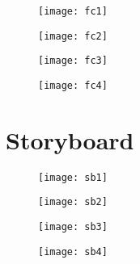 \begin{figure}[!ht]
  \begin{center}
    \texttt{[image: fc1]}
  \end{center}
\end{figure}

\begin{figure}[!ht]
  \begin{center}
    \texttt{[image: fc2]}
  \end{center}
\end{figure}

\begin{figure}[!ht]
  \begin{center}
    \texttt{[image: fc3]}
  \end{center}
\end{figure}

\begin{figure}[!ht]
  \begin{center}
    \texttt{[image: fc4]}
  \end{center}
\end{figure}

\chapter{Storyboard}

\begin{figure}[!ht]
  \begin{center}
    \texttt{[image: sb1]}
  \end{center}
\end{figure}

\begin{figure}[!ht]
  \begin{center}
    \texttt{[image: sb2]}
  \end{center}
\end{figure}

\begin{figure}[!ht]
  \begin{center}
    \texttt{[image: sb3]}
  \end{center}
\end{figure}

\begin{figure}[!ht]
  \begin{center}
    \texttt{[image: sb4]}
  \end{center}
\end{figure}

